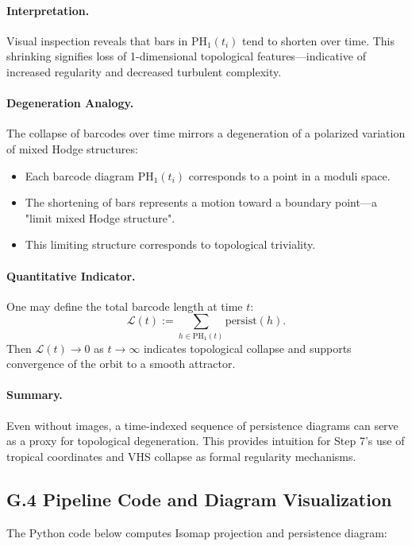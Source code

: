 \documentclass[11pt]{article}
\theoremstyle{definition}
\begin{document}
\paragraph{Interpretation.} Visual inspection reveals that bars in \( \mathrm{PH}_1(t_i) \) tend to shorten over time. This shrinking signifies loss of 1-dimensional topological features---indicative of increased regularity and decreased turbulent complexity.

\paragraph{Degeneration Analogy.} The collapse of barcodes over time mirrors a degeneration of a polarized variation of mixed Hodge structures:
\begin{itemize}
  \item Each barcode diagram \( \mathrm{PH}_1(t_i) \) corresponds to a point in a moduli space.
  \item The shortening of bars represents a motion toward a boundary point---a "limit mixed Hodge structure".
  \item This limiting structure corresponds to topological triviality.
\end{itemize}

\paragraph{Quantitative Indicator.} One may define the total barcode length at time \( t \):
\[ 
\mathcal{L}(t) := \sum_{h \in \mathrm{PH}_1(t)} \text{persist}(h).
\]
Then \( \mathcal{L}(t) \to 0 \) as \( t \to \infty \) indicates topological collapse and supports convergence of the orbit to a smooth attractor.

\paragraph{Summary.} Even without images, a time-indexed sequence of persistence diagrams can serve as a proxy for topological degeneration. This provides intuition for Step 7’s use of tropical coordinates and VHS collapse as formal regularity mechanisms.

\subsection*{G.4 Pipeline Code and Diagram Visualization}

The Python code below computes Isomap projection and persistence diagram:
\end{document}
